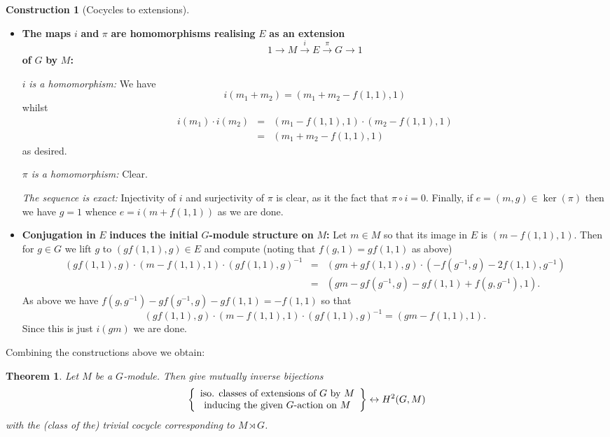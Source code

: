 \documentclass[11pt]{amsart}
\numberwithin{equation}{section}
\newtheorem{theorem}[equation]{Theorem}
\theoremstyle{remark}
\theoremstyle{remark}
\theoremstyle{remark}
\theoremstyle{definition}
\theoremstyle{definition}
\newtheorem{construction}[equation]{Construction}
\theoremstyle{definition}
\theoremstyle{definition}
\theoremstyle{definition}
\theoremstyle{definition}
\begin{document}
\begin{construction}[Cocycles to extensions]
\begin{itemize}
\item \textbf{The maps} $i$ \textbf{and} $\pi$ \textbf{are homomorphisms realising} $E$ \textbf{as an extension}
\[1\longrightarrow M \stackrel{i}{\longrightarrow}E \stackrel{\pi}{\longrightarrow}G\longrightarrow 1\]
\textbf{of} $G$ \textbf{by} $M$\textbf{:}


$i$\textit{ is a homomorphism:} We have
\[i(m_1+m_2)=(m_1+m_2-f(1,1),1)\]
whilst
\begin{eqnarray*}i(m_1)\cdot i(m_2)&=&(m_1-f(1,1),1)\cdot (m_2-f(1,1),1)\\
&=&(m_1+m_2-f(1,1),1)\end{eqnarray*}
as desired.

\textit{$\pi$ is a homomorphism:} Clear.

\textit{The sequence is exact:}  Injectivity of $i$ and surjectivity of $\pi$ is clear, as it the fact that $\pi\circ i=0$. Finally, if $e=(m,g)\in \ker(\pi)$ then we have $g=1$ whence $e=i(m+f(1,1))$ as we are done. 

\item \textbf{Conjugation in} $E$ \textbf{induces the initial} $G$\textbf{-module structure on} $M$\textbf{:} Let $m\in M$ so that its image in $E$ is $(m-f(1,1),1)$. Then for $g\in G$ we lift $g$ to $(gf(1,1),g)\in E$ and compute (noting that $f(g,1)=gf(1,1)$ as above)
\begin{eqnarray*}(gf(1,1),g)\cdot (m-f(1,1),1) \cdot (gf(1,1),g)^{-1}&=&(gm+gf(1,1),g)\cdot (-f(g^{-1},g)-2f(1,1),g^{-1})\\
&=&(gm-gf(g^{-1},g)-gf(1,1)+f(g,g^{-1}),1).\end{eqnarray*}
As above we have $f(g,g^{-1})-gf(g^{-1},g)-gf(1,1)=-f(1,1)$ so that
\[(gf(1,1),g)\cdot (m-f(1,1),1) \cdot (gf(1,1),g)^{-1}=(gm-f(1,1),1).\]
Since this is just $i(gm)$ we are done.
\end{itemize}
\end{construction}

Combining the constructions above we obtain:

\begin{theorem} \label{h2 and extensions theorem}
Let $M$ be a $G$-module. Then  give mutually inverse bijections
\[\left\{\begin{array}{c}\textup{iso. classes of extensions of }G\textup{ by }M\\\textup{inducing the given }G\textup{-action on }M\end{array}\right\}\leftrightarrow H^2(G,M)\]
with the (class of the) trivial cocycle corresponding to $M\rtimes G$.
\end{theorem}
\end{document}
